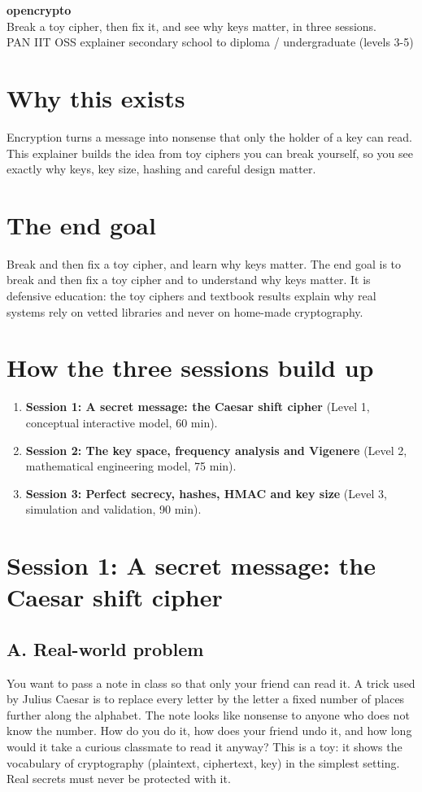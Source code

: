 \documentclass[11pt,a4paper]{article}
\begin{document}
\begin{center}{\LARGE\bfseries opencrypto}\\[0.4em]{\large Break a toy cipher, then fix it, and see why keys matter, in three sessions.}\\[0.2em]\small PAN IIT OSS explainer \textbullet{} secondary school to diploma / undergraduate (levels 3-5)\end{center}

\section*{Why this exists}
Encryption turns a message into nonsense that only the holder of a key can read. This explainer builds the idea from toy ciphers you can break yourself, so you see exactly why keys, key size, hashing and careful design matter.

\section*{The end goal}
Break and then fix a toy cipher, and learn why keys matter. The end goal is to break and then fix a toy cipher and to understand why keys matter. It is defensive education: the toy ciphers and textbook results explain why real systems rely on vetted libraries and never on home-made cryptography.

\section*{How the three sessions build up}
\begin{enumerate}[nosep]
\item \textbf{Session 1: A secret message: the Caesar shift cipher} (Level 1, conceptual interactive model, 60 min).
\item \textbf{Session 2: The key space, frequency analysis and Vigenere} (Level 2, mathematical engineering model, 75 min).
\item \textbf{Session 3: Perfect secrecy, hashes, HMAC and key size} (Level 3, simulation and validation, 90 min).
\end{enumerate}

\section{Session 1: A secret message: the Caesar shift cipher}

\subsection*{A. Real-world problem}
You want to pass a note in class so that only your friend can read it. A trick used by Julius Caesar is to replace every letter by the letter a fixed number of places further along the alphabet. The note looks like nonsense to anyone who does not know the number. How do you do it, how does your friend undo it, and how long would it take a curious classmate to read it anyway? This is a toy: it shows the vocabulary of cryptography (plaintext, ciphertext, key) in the simplest setting. Real secrets must never be protected with it.
\end{document}
